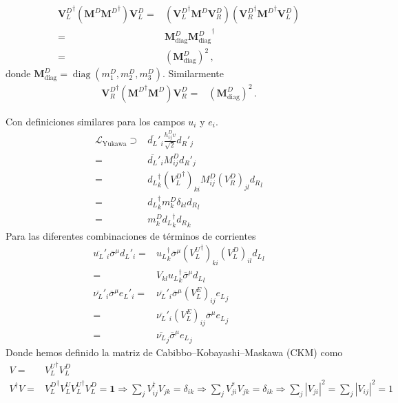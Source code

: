 \begin{frame}
\begin{align}
 {\mathbf{V}_L^D}^\dagger \left(\mathbf{M}^D{\mathbf{M}^D}^\dagger\right)\mathbf{V}_L^D=&
 \left({\mathbf{V}_L^D}^\dagger \mathbf{M}^D\mathbf{V}_R^D\right)\left({\mathbf{V}_R^D}^\dagger{\mathbf{M}^D}^\dagger\mathbf{V}_L^D\right)\nonumber\\
 =& \mathbf{M}^D_{\text{diag}}{\mathbf{M}^D_{\text{diag}}}^\dagger\nonumber\\
 =& \left({\mathbf{M}^D_{\text{diag}}}\right)^2\,,
\end{align}
donde $\mathbf{M}^D_{\text{diag}}=\operatorname{diag}(m_1^D,m_2^D,m_3^D)$. Similarmente
\begin{align}
  {\mathbf{V}_R^D}^\dagger \left({\mathbf{M}^D}^\dagger\mathbf{M}^D\right)\mathbf{V}_R^D=& \left({\mathbf{M}^D_{\text{diag}}}\right)^2\,.
\end{align}

Con definiciones similares para los campos $u_i$ y $e_i$.
\begin{align}
\mathcal{L}_{\text{Yukawa}}\supset&\overline{d_L}'_i\frac{h_{ij}^Dv}{\sqrt{2}} {d_R}'_j\nonumber\\
=&\overline{d_L}'_iM^D_{ij} {d_R}'_j\nonumber\\
=&{d_L}^{\dagger}_k({V^D_L}^\dagger)_{ki}M^D_{ij}(V^D_R)_{jl} {d_R}_l\nonumber\\
=&{d_L}^{\dagger}_km^D_k\delta_{kl} {d_R}_l\nonumber\\
=&m^D_k{d_L}^{\dagger}_k{d_R}_k
\end{align}
Para las diferentes combinaciones de términos de corrientes
\begin{align}
  \overline{u_L}'_i \overline{\sigma}^\mu{d_L}'_i=&{u_L}^{\dagger}_k\overline{\sigma}^\mu({V^U_L}^\dagger)_{ki}(V^D_L)_{il} {d_L}_l\nonumber\\
  =&V_{kl}{u_L}^{\dagger}_k\overline{\sigma}^\mu{d_L}_l\nonumber\\
  \overline{\nu_L}'_i\overline{\sigma}^\mu {e_L}'_i=&\overline{\nu_L}'_i\overline{\sigma}^\mu(V^E_L)_{ij} {e_L}_j\nonumber\\
  =&\overline{\nu_L}'_i(V^E_L)_{ij}\overline{\sigma}^\mu {e_L}_j\nonumber\\
  =&\overline{\nu_L}_j\overline{\sigma}^\mu{e_L}_j
\end{align}
Donde hemos definido la matriz de Cabibbo--Kobayashi--Maskawa (CKM) como
\begin{align}
  \label{eq:230qft}
  V=&{V^U_L}^\dagger V^D_L\nonumber\\
  V^\dagger V=&{V^D_L}^\dagger{V^U_L}{V^U_L}^\dagger V^D_L=\mathbf{1}\Rightarrow \sum_jV^\dagger_{ij}V_{jk}=\delta_{ik}\Rightarrow\sum_jV^*_{ji}V_{jk}=\delta_{ik}\Rightarrow\sum_j|V_{ji}|^2=\sum_j|V_{ij}|^2=1
\end{align}


\end{frame}
